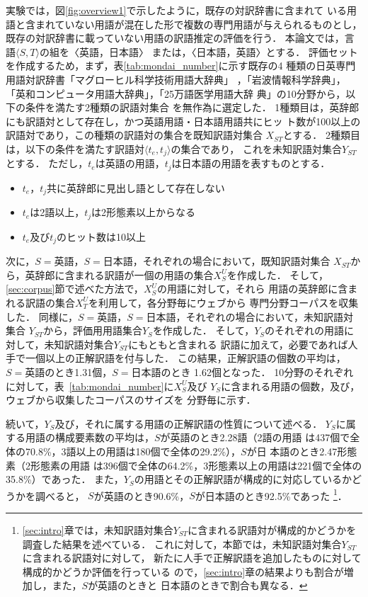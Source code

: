\documentclass[japanese]{jnlp_1.3a}
\begin{document}
実験では，図\ref{fig:overview1}で示したように，既存の対訳辞書に含まれて
いる用語と含まれていない用語が混在した形で複数の専門用語が与えられるものとし，
既存の対訳辞書に載っていない用語の訳語推定の評価を行う．
本論文では，言語$\langle S, T\rangle$の組を〈英語，日本語〉
または，〈日本語，英語〉とする．
評価セットを作成するため，まず，表\ref{tab:mondai_number}に示す既存の4
種類の日英専門用語対訳辞書「マグローヒル科学技術用語大辞典」
\cite{dic-McGraw-Hill}，「岩波情報科学辞典」\cite{dic-iwanami-info}，
「英和コンピュータ用語大辞典」\cite{dic-computer}，「25万語医学用語大辞
典」\cite{dic-25igaku}の10分野から，以下の条件を満たす2種類の訳語対集合
を無作為に選定した．
1種類目は，英辞郎にも訳語対として存在し，かつ英語用語・日本語用語共にヒッ
ト数が100以上の訳語対であり，この種類の訳語対の集合を既知訳語対集合
$X_{ST}$とする．
2種類目は，以下の条件を満たす訳語対$\langle t_e, t_j\rangle$の集合であり，
これを未知訳語対集合$Y_{ST}$とする．
ただし，$t_e$は英語の用語，$t_j$は日本語の用語を表すものとする．
\begin{itemize}
 \item $t_e$，$t_j$共に英辞郎に見出し語として存在しない
 \item $t_e$は2語以上，$t_j$は2形態素以上からなる
 \item $t_e$及び$t_j$のヒット数は10以上
\end{itemize}


次に，$S=英語$，$S=日本語$，それぞれの場合において，既知訳語対集合
$X_{ST}$から，英辞郎に含まれる訳語が一個の用語の集合$X_S^U$を作成した．
そして，\ref{sec:corpus}節で述べた方法で，$X_S^U$の用語に対して，それら
用語の英辞郎に含まれる訳語の集合$X_T^U$を利用して，各分野毎にウェブから
専門分野コーパスを収集した．
同様に，$S=英語$，$S=日本語$，それぞれの場合において，未知訳語対集合
$Y_{ST}$から，評価用用語集合$Y_S$を作成した．
そして，$Y_S$のそれぞれの用語に対して，未知訳語対集合$Y_{ST}$にもともと含まれる
訳語に加えて，必要であれば人手で一個以上の正解訳語を付与した．
この結果，正解訳語の個数の平均は，$S=英語$のとき1.31個，$S=日本語$のとき
1.62個となった．
10分野のそれぞれに対して，表~\ref{tab:mondai_number}に$X_S^U$及び
$Y_{S}$に含まれる用語の個数，及び，ウェブから収集したコーパスのサイズを
分野毎に示す．

続いて，$Y_S$及び，それに属する用語の正解訳語の性質について述べる．
$Y_S$に属する用語の構成要素数の平均は，$S$が英語のとき2.28語（2語の用語
は437個で全体の70.8\%，3語以上の用語は180個で全体の29.2\%），$S$が日
本語のとき2.47形態素（2形態素の用語
は396個で全体の64.2\%，3形態素以上の用語は221個で全体の35.8\%）であった．
また，$Y_S$の用語とその正解訳語が構成的に対応しているかどうかを調べると，
$S$が英語のとき90.6\%，$S$が日本語のとき92.5\%であった
\footnote{
\ref{sec:intro}章では，未知訳語対集合$Y_{ST}$に含まれる訳語対が構成的かどうかを
調査した結果を述べている．
これに対して，本節では，未知訳語対集合$Y_{ST}$に含まれる訳語対に対して，
新たに人手で正解訳語を追加したものに対して構成的かどうか評価を行っている
ので，\ref{sec:intro}章の結果よりも割合が増加し，また，$S$が英語のときと
日本語のときで割合も異なる．
}．
\end{document}
